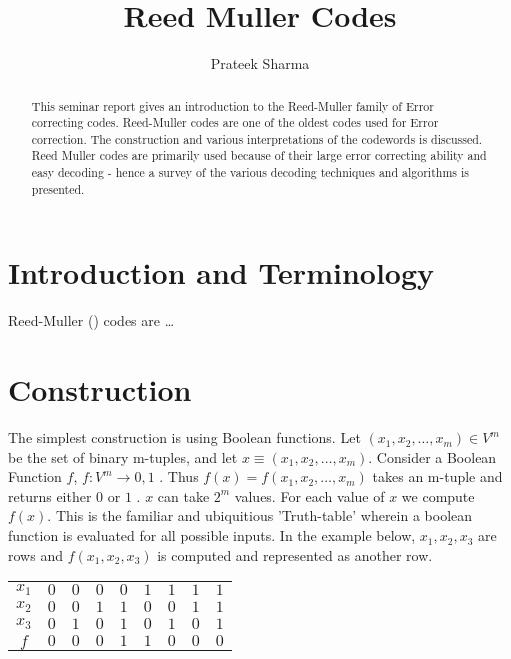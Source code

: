 \documentclass[]{article}
\title{Reed Muller Codes}
\author{Prateek Sharma}
\begin{document}
\maketitle

\begin{abstract} 
This seminar report gives an introduction to the Reed-Muller family of Error correcting codes. Reed-Muller codes are one of the oldest codes used for Error correction. The construction and various interpretations of the codewords is discussed. Reed Muller codes are primarily used because of their large error correcting ability and easy decoding - hence a survey of the various decoding techniques and algorithms is presented.
\end{abstract}


\newcommand{\RM}{\ensuremath{\mathcal{R}}}

\section {Introduction and Terminology}
Reed-Muller () codes are \ldots

\section {Construction}
The simplest construction is using Boolean functions.
Let $(x_1,x_2,\ldots,x_m) \in V^m$ be the set of binary m-tuples, and let $x \equiv (x_1,x_2,\ldots,x_m)$. Consider a Boolean Function $f$, $f: V^m \rightarrow {0,1} $ . Thus $f(x) = f(x_1,x_2,\ldots,x_m)$ takes an m-tuple and returns either $0$ or $1$ .
$x$ can take $2^m$ values. For each value of $x$ we compute $f(x)$. This is the familiar and ubiquitious 'Truth-table' wherein a boolean function is evaluated for all possible inputs.
In the example below, $x_1, x_2, x_3$ are rows and $f(x_1, x_2, x_3)$ is computed and represented as another row. 
\begin {center}
\begin{tabular}{|c|c|c|c|c|c|c|c|c|}
$x_1$ & $0$ & $0$ & $0$ & $0$ & $1$ & $1$ & $1$ & $1$ \\
$x_2$ & $0$ & $0$ & $1$ & $1$ & $0$ & $0$ & $1$ & $1$ \\
$x_3$ & $0$ & $1$ & $0$ & $1$ & $0$ & $1$ & $0$ & $1$ \\
$f$   & $0$ & $0$ & $0$ & $1$ & $1$ & $0$ & $0$ & $0$ \\

\end{tabular}
\end{center} 
\end{document}
